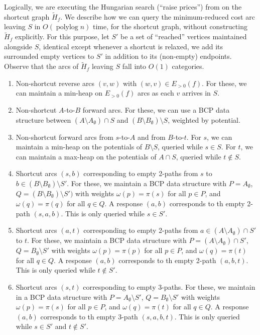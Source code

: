 \documentclass[11pt]{article}
\def\polylog{\mathop{\mathrm{polylog}}}
\theoremstyle{plain}
\numberwithin{figure}{section}
\begin{document}
Logically, we are executing the Hungarian search (``raise prices'') from
\cite[Section 3.2]{GHKT17} on the shortcut graph $\tilde{H}_f$.
We describe how we can query the minimum-reduced cost arc leaving $S$ in
$O(\polylog n)$ time, for the shortcut graph, without constructing
$\tilde{H}_f$ explicitly.
For this purpose, let $S'$ be a set of ``reached'' vertices maintained
alongside $S$, identical except whenever a shortcut is relaxed, we add its
surrounded empty vertices to $S'$ in addition to its (non-empty) endpoints.
Observe that the arcs of $\tilde{H}_f$ leaving $S$ fall into $O(1)$ categories.
\begin{enumerate}
\item Non-shortcut reverse arcs $(v, w)$ with $(w, v) \in E_{>0}(f)$.
	For these, we can maintain a min-heap on $E_{>0}(f)$ arcs as each $v$
	arrives in $S$.
\item Non-shortcut $A$-to-$B$ forward arcs.
	For these, we can use a BCP data structure between
	$(A \setminus A_\emptyset) \cap S$ and
	$(B \setminus B_\emptyset) \setminus S$, weighted by potential.
\item Non-shortcut forward arcs from $s$-to-$A$ and from $B$-to-$t$.
	For $s$, we can maintain a min-heap on the potentials of
	$B \setminus S$, queried while $s \in S$.
	For $t$, we can maintain a max-heap on the potentials of
	$A \cap S$, queried while $t \not\in S$.

\item Shortcut arcs $(s, b)$ corresponding to empty 2-paths from $s$ to
	$b \in (B \setminus B_\emptyset) \setminus S'$.
	For these, we maintain a BCP data structure with $P = A_\emptyset$,
	$Q = (B \setminus B_\emptyset) \setminus S')$ with weights
	$\omega(p) = \pi(s)$ for all $p \in P$, and $\omega(q) = \pi(q)$ for
	all $q \in Q$.
	A response $(a, b)$ corresponds to th empty 2-path $(s, a, b)$.
	This is only queried while $s \in S'$.
\item Shortcut arcs $(a, t)$ corresponding to empty 2-paths from
	$a \in (A \setminus A_\emptyset) \cap S'$ to $t$.
	For these, we maintain a BCP data structure with
	$P = (A \setminus A_\emptyset) \cap S'$,
	$Q = B_\emptyset \setminus S'$ with weights $\omega(p) = \pi(p)$ for
	all $p \in P$, and $\omega(q) = \pi(t)$ for all $q \in Q$.
	A response $(a, b)$ corresponds to th empty 2-path $(a, b, t)$.
	This is only queried while $t \not\in S'$.
\item Shortcut arcs $(s, t)$ corresponding to empty 3-paths.
	For these, we maintain in a BCP data structure with
	$P = A_\emptyset \setminus S'$, $Q = B_\emptyset \setminus S'$ with
	weights $\omega(p) = \pi(s)$ for all
	$p \in P$, and $\omega(q) = \pi(t)$ for all $q \in Q$.
	A response $(a, b)$ corresponds to th empty 3-path $(s, a, b, t)$.
	This is only queried while $s \in S'$ and $t \not\in S'$.
\end{enumerate}
\end{document}
